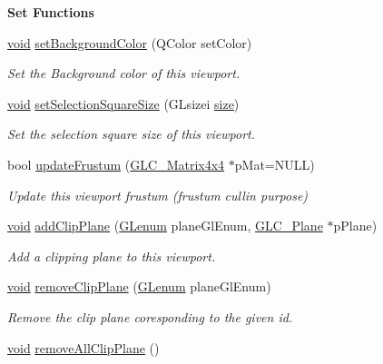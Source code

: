 \begin{Indent}{\bf Set Functions}
\begin{DoxyCompactItemize}
\hyperlink{group___u_a_v_objects_plugin_ga444cf2ff3f0ecbe028adce838d373f5c}{void} \hyperlink{class_g_l_c___viewport_acd163c85c4df0dcdf897e01d92a26386}{set\-Background\-Color} (Q\-Color set\-Color)
\begin{DoxyCompactList}\small\item\em Set the Background color of this viewport. \end{DoxyCompactList}\item 
\hyperlink{group___u_a_v_objects_plugin_ga444cf2ff3f0ecbe028adce838d373f5c}{void} \hyperlink{class_g_l_c___viewport_ad825a35b48c2f3b17f343e4580d2fb4d}{set\-Selection\-Square\-Size} (G\-Lsizei \hyperlink{glext_8h_a014d89bd76f74ef3a29c8f04b473eb76}{size})
\begin{DoxyCompactList}\small\item\em Set the selection square size of this viewport. \end{DoxyCompactList}\item 
bool \hyperlink{class_g_l_c___viewport_a17f674340b9595b4aac09788944a6958}{update\-Frustum} (\hyperlink{class_g_l_c___matrix4x4}{G\-L\-C\-\_\-\-Matrix4x4} $\ast$p\-Mat=N\-U\-L\-L)
\begin{DoxyCompactList}\small\item\em Update this viewport frustum (frustum cullin purpose) \end{DoxyCompactList}\item 
\hyperlink{group___u_a_v_objects_plugin_ga444cf2ff3f0ecbe028adce838d373f5c}{void} \hyperlink{class_g_l_c___viewport_a0c43abb42bbbbb7213f8d9471e0fefc0}{add\-Clip\-Plane} (\hyperlink{glext_8h_a508b2dec21679e2e346cad3e0d1969bf}{G\-Lenum} plane\-Gl\-Enum, \hyperlink{class_g_l_c___plane}{G\-L\-C\-\_\-\-Plane} $\ast$p\-Plane)
\begin{DoxyCompactList}\small\item\em Add a clipping plane to this viewport. \end{DoxyCompactList}\item 
\hyperlink{group___u_a_v_objects_plugin_ga444cf2ff3f0ecbe028adce838d373f5c}{void} \hyperlink{class_g_l_c___viewport_a5342f89de42bb3149bf5f1db823d71d1}{remove\-Clip\-Plane} (\hyperlink{glext_8h_a508b2dec21679e2e346cad3e0d1969bf}{G\-Lenum} plane\-Gl\-Enum)
\begin{DoxyCompactList}\small\item\em Remove the clip plane coresponding to the given id. \end{DoxyCompactList}\item 
\hyperlink{group___u_a_v_objects_plugin_ga444cf2ff3f0ecbe028adce838d373f5c}{void} \hyperlink{class_g_l_c___viewport_a44ab32ea30d39bedcc379ef33aac62cf}{remove\-All\-Clip\-Plane} ()

\end{DoxyCompactItemize}
\end{Indent}
